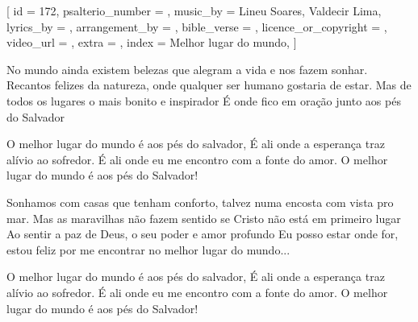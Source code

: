 
[
    id                     = {172},
    psalterio_number       = {},
    music_by               = {Lineu Soares, Valdecir Lima},
    lyrics_by              = {},
    arrangement_by         = {},
    bible_verse            = {},
    licence_or_copyright   = {},
    video_url              = {},
    extra                  = {},
    index                  = {Melhor lugar do mundo},
]

\beginverse
No mundo ainda existem belezas que alegram a vida e nos fazem sonhar.
Recantos felizes da natureza, onde qualquer ser humano gostaria de estar.
Mas de todos os lugares o mais bonito e inspirador
É onde fico em oração junto aos pés do Salvador
\endverse

\beginchorus
O melhor lugar do mundo é aos pés do salvador,
É ali onde a esperança traz alívio ao sofredor.
É ali onde eu me encontro com a fonte do amor.
O melhor lugar do mundo é aos pés do Salvador!
\endchorus

\beginverse
Sonhamos com casas que tenham conforto, talvez numa encosta com vista pro mar.
Mas as maravilhas não fazem sentido se Cristo não está em primeiro lugar
Ao sentir a paz de Deus, o seu poder e amor profundo
Eu posso estar onde for, estou feliz por me encontrar no melhor lugar do mundo...
\endverse

\beginchorus
O melhor lugar do mundo é aos pés do salvador,
É ali onde a esperança traz alívio ao sofredor.
É ali onde eu me encontro com a fonte do amor.
O melhor lugar do mundo é aos pés do Salvador!
\endchorus


\endsong
